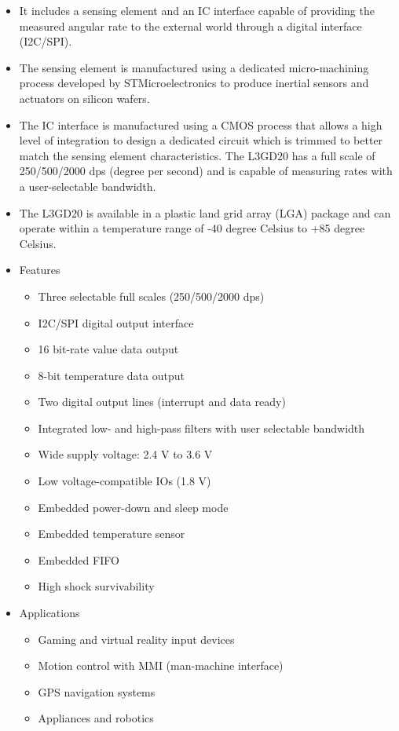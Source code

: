 \documentclass[11pt,a4paper]{article}
\begin{document}
\begin{itemize}
\item It includes a sensing element and an IC interface
capable of providing the measured angular rate to
the external world through a digital interface
(I2C/SPI).

\item The sensing element is manufactured using a
dedicated  micro-machining process developed by
STMicroelectronics to produce inertial sensors
and actuators on silicon wafers.

\item The IC interface is manufactured using a CMOS
process that allows a high level of integration to
design a dedicated circuit which is trimmed to
better match the sensing element characteristics.
The L3GD20 has a full scale of 250/500/2000
dps (degree per second) and is capable of measuring rates with a
user-selectable bandwidth.

\item The L3GD20 is available in a plastic land grid
array (LGA) package and can operate within a
temperature range of -40 degree Celsius to +85 degree Celsius.

\item Features 
\begin{itemize}
\item Three selectable full scales (250/500/2000
dps)
\item I2C/SPI digital output interface
\item 16 bit-rate value data output
\item 8-bit temperature data output
\item Two digital output lines (interrupt and data
ready)
\item Integrated low- and high-pass filters with user selectable
bandwidth
\item Wide supply voltage: 2.4 V to 3.6 V
\item Low voltage-compatible IOs (1.8 V)
\item Embedded power-down and sleep mode
\item Embedded temperature sensor
\item Embedded FIFO
\item High shock survivability

\end{itemize}

\item Applications
\begin{itemize}
\item Gaming and virtual reality input devices
\item Motion control with MMI (man-machine
interface)
\item GPS navigation systems
\item Appliances and robotics
\end{itemize}



\end{itemize}
\end{document}
